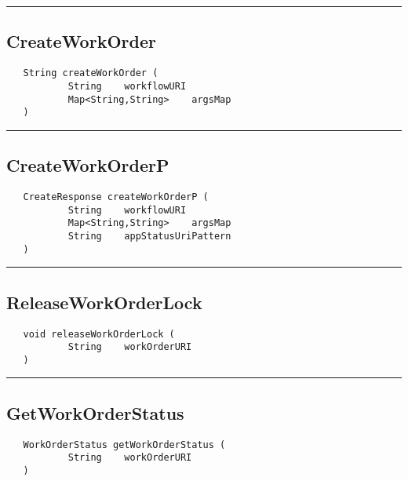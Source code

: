 \rule{15cm}{2pt}
\subsection{CreateWorkOrder}
\label{Api:CreateWorkOrder}
\begin{verbatim}
   String createWorkOrder (
           String    workflowURI
           Map<String,String>    argsMap
   )
\end{verbatim}



\rule{15cm}{2pt}
\subsection{CreateWorkOrderP}
\label{Api:CreateWorkOrderP}
\begin{verbatim}
   CreateResponse createWorkOrderP (
           String    workflowURI
           Map<String,String>    argsMap
           String    appStatusUriPattern
   )
\end{verbatim}



\rule{15cm}{2pt}
\subsection{ReleaseWorkOrderLock}
\label{Api:ReleaseWorkOrderLock}
\begin{verbatim}
   void releaseWorkOrderLock (
           String    workOrderURI
   )
\end{verbatim}



\rule{15cm}{2pt}
\subsection{GetWorkOrderStatus}
\label{Api:GetWorkOrderStatus}
\begin{verbatim}
   WorkOrderStatus getWorkOrderStatus (
           String    workOrderURI
   )
\end{verbatim}



